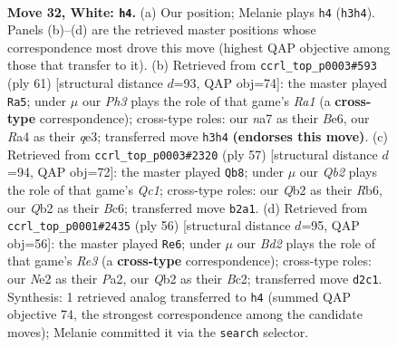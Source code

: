 \documentclass[11pt]{article}
\begin{document}
\clearpage

\begin{figure}[p]\centering
\begin{subfigure}{0.46\textwidth}\centering
\resizebox{\linewidth}{!}{%
\newchessgame
\chessboard[
  setfen={1r3b2/n3rk2/p2p2p1/3P3p/Rpq1p3/4R2P/1Q1BNPP1/5K2 w - - 0 32},
  showmover=false,
  pgfstyle=straightmove, color=movearrow, markmove={h3-h4}
]}
\caption{}
\end{subfigure}\hfill
\begin{subfigure}{0.46\textwidth}\centering
\resizebox{\linewidth}{!}{%
\newchessgame
\chessboard[
  setfen={r2r4/6kp/4b1p1/4q3/P3p3/1p2Q1P1/1P2P1BP/RR4K1 b - - 1 31},
  showmover=false,
  pgfstyle=straightmove, color=movearrow, markmove={a8-a5}
]}
\caption{}
\end{subfigure}
\\[4pt]
\begin{subfigure}{0.46\textwidth}\centering
\resizebox{\linewidth}{!}{%
\newchessgame
\chessboard[
  setfen={r1q5/4ppkp/Prbp2p1/2n5/4P3/R1N2P1P/6P1/R3QBK1 b - - 4 29},
  showmover=false,
  pgfstyle=straightmove, color=movearrow, markmove={c8-b8}
]}
\caption{}
\end{subfigure}\hfill
\begin{subfigure}{0.46\textwidth}\centering
\resizebox{\linewidth}{!}{%
\newchessgame
\chessboard[
  setfen={1r1q1rk1/p5p1/2bp2Pp/1p3p2/3P1Q2/2P1R1P1/P1BK4/1R6 w - - 2 29},
  showmover=false,
  pgfstyle=straightmove, color=movearrow, markmove={e3-e6}
]}
\caption{}
\end{subfigure}
\caption{\textbf{Move 32, White: \texttt{h4}.} (a) Our position; Melanie plays \texttt{h4} (\texttt{h3h4}). Panels (b)--(d) are the retrieved master positions whose correspondence most drove this move (highest QAP objective among those that transfer to it). (b) Retrieved from \texttt{ccrl\_top\_p0003\#593} (ply 61) [structural distance $d$=93, QAP obj=74]: the master played \texttt{Ra5}; under $\mu$ our \emph{Ph3} plays the role of that game's \emph{Ra1} (a \textbf{cross-type} correspondence); cross-type roles: our \emph{n}a7 as their \emph{B}e6, our \emph{R}a4 as their \emph{q}e3; transferred move \texttt{h3h4} \textbf{(endorses this move)}. (c) Retrieved from \texttt{ccrl\_top\_p0003\#2320} (ply 57) [structural distance $d$=94, QAP obj=72]: the master played \texttt{Qb8}; under $\mu$ our \emph{Qb2} plays the role of that game's \emph{Qc1}; cross-type roles: our \emph{Q}b2 as their \emph{R}b6, our \emph{Q}b2 as their \emph{B}c6; transferred move \texttt{b2a1}. (d) Retrieved from \texttt{ccrl\_top\_p0001\#2435} (ply 56) [structural distance $d$=95, QAP obj=56]: the master played \texttt{Re6}; under $\mu$ our \emph{Bd2} plays the role of that game's \emph{Re3} (a \textbf{cross-type} correspondence); cross-type roles: our \emph{N}e2 as their \emph{P}a2, our \emph{Q}b2 as their \emph{B}c2; transferred move \texttt{d2c1}. Synthesis: 1 retrieved analog transferred to \texttt{h4} (summed QAP objective 74, the strongest correspondence among the candidate moves); Melanie committed it via the \texttt{search} selector.}
\label{fig:thought-m62}
\end{figure}
\end{document}
